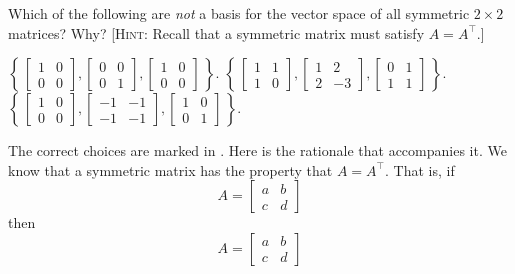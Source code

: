 \begin{questions}
  \question Which of the following are \emph{not} a basis for the vector
  space of all symmetric $2\times 2$ matrices? Why? [\textsc{Hint}: Recall
  that a symmetric matrix must satisfy $A=A^\intercal$.]
  \begin{choices}
    \choice%
    $\displaystyle\left\{\,%
      \begin{bmatrix}1&0\\0&0\end{bmatrix},%
      \begin{bmatrix}0&0\\0&1\end{bmatrix},
      \begin{bmatrix}1&0\\0&0\end{bmatrix}%
      \,\right\}$.%
    \CorrectChoice%
    $\displaystyle\left\{\,%
      \begin{bmatrix}1&1\\1&0\end{bmatrix},
      \begin{bmatrix}1&2\\2&-3\end{bmatrix},
      \begin{bmatrix}0&1\\1&1\end{bmatrix}%
      \,\right\}$.%
    \CorrectChoice%
    $\displaystyle\left\{\,
      \begin{bmatrix}1&0\\0&0\end{bmatrix},
      \begin{bmatrix}-1&-1\\-1&-1\end{bmatrix},%
      \begin{bmatrix}1&0\\0&1\end{bmatrix}%
      \,\right\}$.%
  \end{choices}
  \begin{solution}
    The correct choices are marked in . Here is the
    rationale that accompanies it. We know that a symmetric matrix has the
    property that $A=A^\intercal$. That is, if
    \[
      A=\begin{bmatrix} a&b\\c&d
      \end{bmatrix}
    \]
    then
    \[
      A=
      \begin{bmatrix}
        a&b\\c&d

\end{bmatrix}\]
\end{solution}
\end{questions}

